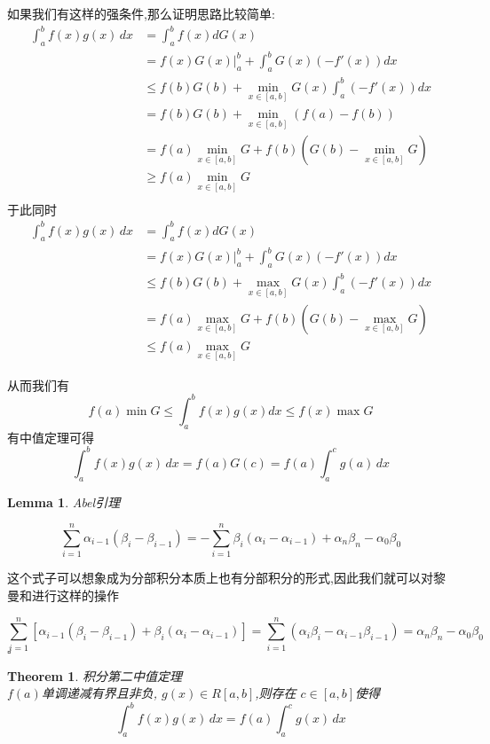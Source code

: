 \documentclass[11pt,hyperref,a4paper,UTF8]{ctexart}
\newtheorem{theorem}{Theorem}[subsection]
\newtheorem{lemma}{Lemma}[subsection]
\newenvironment{cproof}{%
\heiti{证明}\kaishu
}{%
  \hfill $\square$
  \par\bigskip
}
\newcommand{\parameter}[1]{\left(#1\right)}
\newcommand{\bracket}[1]{\left[#1\right]}
\begin{document}
\begin{CJK}{UTF8}{gkai}
如果我们有这样的强条件,那么证明思路比较简单:
\[\begin{aligned}
  \int_{a}^{b}f(x)g(x)\, dx &= \int_{a}^{b}f(x)d G(x)\\
  &= f(x) G(x) |_{a}^{b} + \int_{a}^{b} G(x) (- f'(x)) dx\\
  &\leq f(b)G(b)+ \min_{x \in [a,b]} G(x) \int_{a}^{b}(-f'(x))dx\\
  &= f(b)G(b) + \min_{x \in [a,b]} \parameter{f(a) - f(b)}\\
  &= f(a) \min_{x \in [a,b]} G + f(b) (G(b) - \min_{x \in [a,b]} G)\\
  &\geq f(a)\min_{x \in [a,b]} G\\
\end{aligned}\]
于此同时
\[\begin{aligned}
  \int_{a}^{b}f(x)g(x)\, dx &= \int_{a}^{b}f(x)d G(x)\\
  &= f(x) G(x) |_{a}^{b} + \int_{a}^{b} G(x) (- f'(x)) dx\\
  &\leq f(b)G(b) + \max_{x \in [a,b]} G(x) \int_{a}^{b}(-f'(x))dx\\
  &= f(a) \max_{x \in [a,b]} G + f(b) (G(b) - \max_{x \in [a,b]} G)\\
  &\leq f(a)\max_{x \in [a,b]} G
\end{aligned}\]

从而我们有
\[f(a) \min G \leq \int_{a}^{b} f(x)g(x) dx \leq f(x) \max G\]
有中值定理可得
\[\int_{a}^{b}f(x)g(x)\, dx = f(a) G(c) = f(a) \int_{a}^{c} g(a)\, dx\]

\begin{lemma}
  Abel引理

  \[\sum_{i = 1}^{n} \alpha_{i- 1} (\beta_i - \beta_{i -1}) = -\sum_{i = 1}^{n} \beta_i(\alpha_i - \alpha_{i - 1}) + \alpha_n \beta_n - \alpha_0 \beta_0\]
\end{lemma}

这个式子可以想象成为分部积分本质上也有分部积分的形式,因此我们就可以对黎曼和进行这样的操作

\begin{cproof}
  \[\sum_{i =1}^{n} \bracket{\alpha_{i- 1} (\beta_i - \beta_{i -1}) + \beta_i(\alpha_i - \alpha_{i - 1})} = \sum_{i = 1}^{n} (\alpha_i \beta_i - \alpha_{i - 1} \beta_{i -1 }) = \alpha_n \beta_n - \alpha_0 \beta_0\]
\end{cproof}

\begin{theorem}
  积分第二中值定理\\

  $f(a)$单调递减有界且非负, $g(x) \in R[a,b]$,则存在 $c \in [a,b]$使得
  \[\int_{a}^{b} f(x)g(x)\, dx = f(a) \int_{a}^{c} g(x)\, dx\]
\end{theorem}


\end{CJK}
\end{document}
